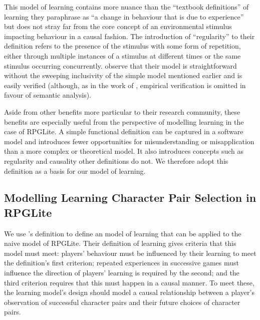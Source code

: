 This model of learning contains more nuance than the ``textbook definitions'' of
learning they paraphrase as ``a change in behaviour that is due to experience''
but does not stray far from the core concept of an environmental stimulus
impacting behaviour in a causal fashion. The introduction of ``regularity'' to
their definition refers to the presence of the stimulus with some form of
repetition, either through multiple instances of a stimulus at different times
or the same stimulus occurring concurrently. \citet{de2013learning} observe that
their model is straightforward without the sweeping inclusivity of the simple
model mentioned earlier and is easily verified (although, as in the work of
\citet{lachman1997learning}, empirical verification is omitted in favour of
semantic analysis).

Aside from other benefits more particular to their research community, these
benefits are especially useful from the perspective of modelling learning in the
case of RPGLite. A simple functional definition can be captured in a software
model and introduces fewer opportunities for misunderstanding or misapplication
than a more complex or theoretical model. It also introduces  concepts such as
regularity and causality other definitions do not. We therefore adopt this
definition as a basis for our model of learning.



\subsection{Modelling Learning Character Pair Selection in RPGLite}
\label{subsec:defining_our_models_of_learning}
\label{learning_model_details}


We use \citet{de2013learning}'s definition to define an \aspectoriented{} model
of learning that can be applied to the naive model of RPGLite. Their definition
of learning gives criteria that this model must meet: players' behaviour must be
influenced by their learning to meet the definition's first criterion; repeated
experiences in successive games must influence the direction of players'
learning is required by the second; and the third criterion requires that this
must happen in a causal manner. To meet these, the learning model's design
should model a causal relationship between a player's observation of successful
character pairs and their future choices of character pairs.

